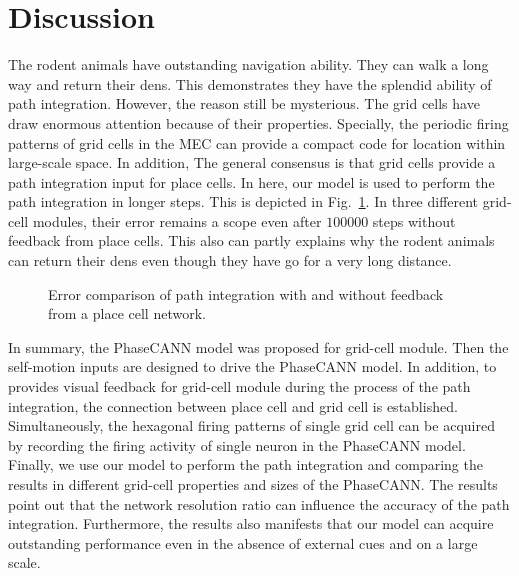 \documentclass[final,5p,times,twocolumn]{elsarticle}
\begin{document}
\section{Discussion}
The rodent animals have outstanding navigation ability\citep{Ball2013}. They can walk a long way and return their dens. This demonstrates they have the splendid ability of path integration. However, the reason still be mysterious. The grid cells have draw enormous attention because of their properties. Specially, the periodic firing patterns of grid cells in the MEC can provide a compact  code for location within large-scale space\citep{Bush2015}. In addition, The general consensus is that grid cells provide a path integration input for place cells\citep{McNaughton2006}. In here, our model is used to perform the path integration in longer steps. This is depicted in Fig.~\ref{fig:path_integration_long}. In three different grid-cell modules, their error remains a scope even after $100000$ steps without feedback from place cells. This also can partly explains why the rodent animals can return their dens even though they have go for a very long distance. 
\begin{figure}[!t]
	\centering
	\caption{Error comparison of path integration with and without feedback from a place cell network.  }
	\label{fig:path_integration_long}
\end{figure}

In summary, the PhaseCANN model was proposed for grid-cell module. Then the self-motion inputs are designed to drive the PhaseCANN model. In addition, to provides visual feedback for grid-cell module during the process of the path integration, the connection between place cell and grid cell is established. Simultaneously, the hexagonal firing patterns of single grid cell can be acquired by recording the firing activity of single neuron in the PhaseCANN model. Finally, we use our model to perform the path integration and comparing the results in different grid-cell properties and sizes of the PhaseCANN. The results point out that the network resolution ratio can influence the accuracy of the path integration. Furthermore, the results also manifests that our model can acquire outstanding performance even in the absence of external cues and on a large scale.
\end{document}
